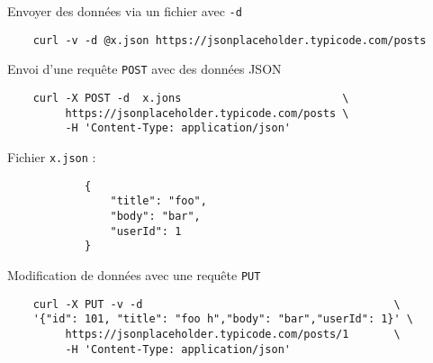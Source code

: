 \documentclass[a4paper]{report}
\begin{document}
    \begin{EExample}{Envoyer des données via un fichier avec \texttt{-d}}{}
        \begin{lstlisting}
    curl -v -d @x.json https://jsonplaceholder.typicode.com/posts
        \end{lstlisting}
        \begin{center}
            \hyperlink{Envoyer des données via un fichier avec curl}{
            }
        \end{center}
    \end{EExample}

    \begin{EExample}{Envoi d'une requête \texttt{POST} avec des données JSON}{} 
        \begin{lstlisting}
    curl -X POST -d  x.jons                         \
         https://jsonplaceholder.typicode.com/posts \
         -H 'Content-Type: application/json'
        \end{lstlisting}
        \fontfamily{lmss}\selectfont Fichier \texttt{x.json} :  
        \begin{lstlisting}
            {
                "title": "foo",
                "body": "bar",
                "userId": 1
            }
        \end{lstlisting}
        \begin{center}
            \hyperlink{Requête POST avec curl}{
            }
        \end{center}
    \end{EExample}

    \begin{EExample}{Modification de données avec une requête \texttt{PUT}}{}
        \begin{lstlisting}
    curl -X PUT -v -d                                       \
    '{"id": 101, "title": "foo h","body": "bar","userId": 1}' \
         https://jsonplaceholder.typicode.com/posts/1       \
         -H 'Content-Type: application/json'
        \end{lstlisting}
        \begin{center}
            \hyperlink{Requête PUT avec curl}{
            }
        \end{center}
    \end{EExample}
\end{document}
